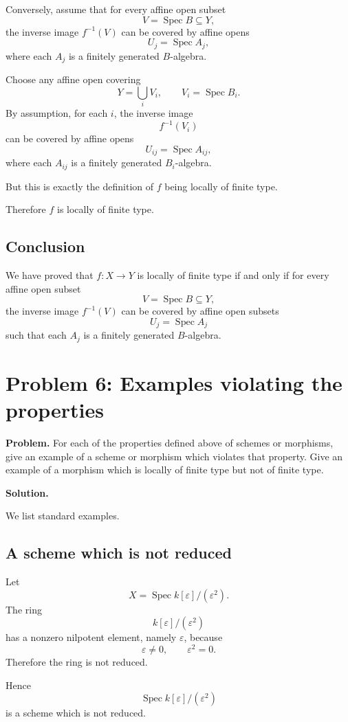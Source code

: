 \documentclass[12pt,a4paper]{article}
\DeclareMathOperator{\Spec}{Spec}
\providecommand{\Spec}{\operatorname{Spec}}
\theoremstyle{notespace}
\begin{document}
Conversely, assume that for every affine open subset
\[
V=\Spec B\subseteq Y,
\]
the inverse image \(f^{-1}(V)\) can be covered by affine opens
\[
U_j=\Spec A_j,
\]
where each \(A_j\) is a finitely generated \(B\)-algebra.

Choose any affine open covering
\[
Y=\bigcup_i V_i,
\qquad
V_i=\Spec B_i.
\]
By assumption, for each \(i\), the inverse image
\[
f^{-1}(V_i)
\]
can be covered by affine opens
\[
U_{ij}=\Spec A_{ij},
\]
where each \(A_{ij}\) is a finitely generated \(B_i\)-algebra.

But this is exactly the definition of \(f\) being locally of finite type.

Therefore \(f\) is locally of finite type.

\subsection*{Conclusion}

We have proved that \(f:X\to Y\) is locally of finite type if and only if for every affine open subset
\[
V=\Spec B\subseteq Y,
\]
the inverse image \(f^{-1}(V)\) can be covered by affine open subsets
\[
U_j=\Spec A_j
\]
such that each \(A_j\) is a finitely generated \(B\)-algebra.

\section{Problem 6: Examples violating the properties}

\textbf{Problem.}
For each of the properties defined above of schemes or morphisms, give an example of a scheme or morphism which violates that property. Give an example of a morphism which is locally of finite type but not of finite type.

\bigskip

\textbf{Solution.}

We list standard examples.

\subsection*{A scheme which is not reduced}

Let
\[
X=\Spec k[\varepsilon]/(\varepsilon^2).
\]
The ring
\[
k[\varepsilon]/(\varepsilon^2)
\]
has a nonzero nilpotent element, namely \(\varepsilon\), because
\[
\varepsilon\neq 0,
\qquad
\varepsilon^2=0.
\]
Therefore the ring is not reduced.

Hence
\[
\Spec k[\varepsilon]/(\varepsilon^2)
\]
is a scheme which is not reduced.
\end{document}
